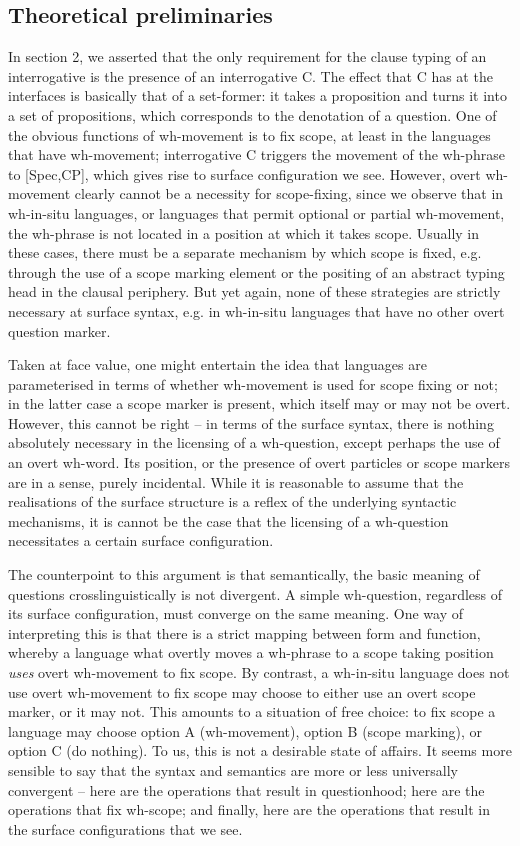 \documentclass{glossa}
\begin{document}
\subsection{Theoretical preliminaries}
In section 2, we asserted that the only requirement for the clause typing of an interrogative is the presence of an interrogative C. The effect that C has at the interfaces is basically that of a set-former: it takes a proposition and turns it into a set of propositions, which corresponds to the denotation of a question. One of the obvious functions of wh-movement is to fix scope, at least in the languages that have wh-movement; interrogative C triggers the movement of the wh-phrase to [Spec,CP], which gives rise to surface configuration we see. However, overt wh-movement clearly cannot be a necessity for scope-fixing, since we observe that in wh-in-situ languages, or languages that permit optional or partial wh-movement, the wh-phrase is not located in a position at which it takes scope. Usually in these cases, there must be a separate mechanism by which scope is fixed, e.g. through the use of a scope marking element or the positing of an abstract typing head in the clausal periphery. But yet again, none of these strategies are strictly necessary at surface syntax, e.g. in wh-in-situ languages that have no other overt question marker.

Taken at face value, one might entertain the idea that languages are parameterised in terms of whether wh-movement is used for scope fixing or not; in the latter case a scope marker is present, which itself may or may not be overt. However, this cannot be right -- in terms of the surface syntax, there is nothing absolutely necessary in the licensing of a wh-question, except perhaps the use of an overt wh-word. Its position, or the presence of overt particles or scope markers are in a sense, purely incidental. While it is reasonable to assume that the realisations of the surface structure is a reflex of the underlying syntactic mechanisms, it is cannot be the case that the licensing of a wh-question necessitates a certain surface configuration.

The counterpoint to this argument is that semantically, the basic meaning of questions crosslinguistically is not divergent. A simple wh-question, regardless of its surface configuration, must converge on the same meaning. One way of interpreting this is that there is a strict mapping between form and function, whereby a language what overtly moves a wh-phrase to a scope taking position \textit{uses} overt wh-movement to fix scope. By contrast, a wh-in-situ language does not use overt wh-movement to fix scope may choose to either use an overt scope marker, or it may not. This amounts to a situation of free choice: to fix scope a language may choose option A (wh-movement), option B (scope marking), or option C (do nothing). To us, this is not a desirable state of affairs. It seems more sensible to say that the syntax and semantics are more or less universally convergent -- here are the operations that result in questionhood; here are the operations that fix wh-scope; and finally, here are the operations that result in the surface configurations that we see.
\end{document}
